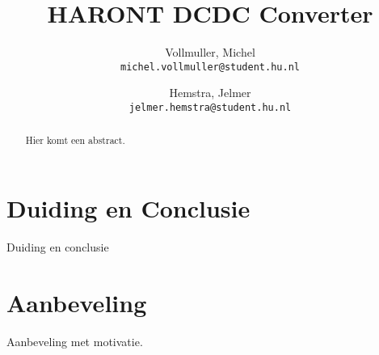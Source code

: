 \documentclass{article}
\title{HARONT DCDC Converter}
\author{
  Vollmuller, Michel\\
  \texttt{michel.vollmuller@student.hu.nl}
  \and
  Hemstra, Jelmer\\
  \texttt{jelmer.hemstra@student.hu.nl}
}
\begin{document}
\maketitle

\begin{abstract}
    Hier komt een abstract.
\end{abstract}










\section{Duiding en Conclusie}
Duiding en conclusie


\section{Aanbeveling}
Aanbeveling met motivatie.



\appendix
\end{document}
